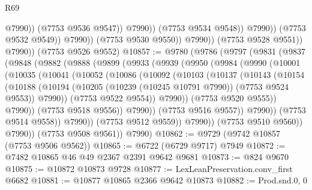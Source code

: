 \begin{lexlean}{R69}
\begin{coremodule}
{                                      @7990))
                                  (@7753 @9536 @9547))
                                @7990))
                            (@7753 @9534 @9548))
                          @7990))
                      (@7753 @9532 @9549))
                    @7990))
                (@7753 @9530 @9550))
              @7990))
          (@7753 @9528 @9551))
        @7990))
    (@7753 @9526 @9552)
@10857 := @9780
    (@9786
      (@9797
        (@9831
          (@9837
            (@9848
              (@9882
                (@9888
                  (@9899
                    (@9933
                      (@9939
                        (@9950
                          (@9984
                            (@9990
                              (@10001
                                (@10035
                                  (@10041
                                    (@10052
                                      (@10086
                                        (@10092
                                          (@10103
                                            (@10137
                                              (@10143
                                                (@10154
                                                  (@10188
                                                    (@10194
                                                      (@10205
                                                        (@10239 (@10245 @10791 @7990))
                                                        (@7753 @9524 @9553))
                                                      @7990))
                                                  (@7753 @9522 @9554))
                                                @7990))
                                            (@7753 @9520 @9555))
                                          @7990))
                                      (@7753 @9518 @9556))
                                    @7990))
                                (@7753 @9516 @9557))
                              @7990))
                          (@7753 @9514 @9558))
                        @7990))
                    (@7753 @9512 @9559))
                  @7990))
              (@7753 @9510 @9560))
            @7990))
        (@7753 @9508 @9561))
      @7990)
@10862 := @9729 (@9742 @10857 (@7753 @9506 @9562))
@10865 := @6722 (@6729 @9717) @7949
@10872 := @7482 @10865 @46 @49 @2367 @2391 @9642 @9681
@10873 := @824 @9670
@10875 := @10872 @10873 @9728
@10877 := LexLeanPreservation.conv_first @6682
@10881 := @10877 @10865 @2366 @9642 @10873
@10882 := Prod.snd.{0, 0}
}
\end{coremodule}
\end{lexlean}
